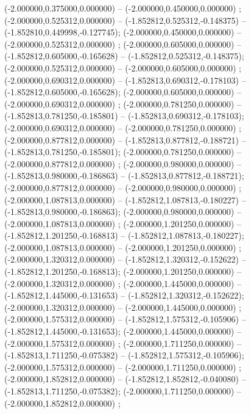  (-2.000000,0.375000,0.000000) -- (-2.000000,0.450000,0.000000) ;
 (-2.000000,0.525312,0.000000) -- (-1.852812,0.525312,-0.148375) -- (-1.852810,0.449998,-0.127745);
 (-2.000000,0.450000,0.000000) -- (-2.000000,0.525312,0.000000) ;
 (-2.000000,0.605000,0.000000) -- (-1.852812,0.605000,-0.165628) -- (-1.852812,0.525312,-0.148375);
 (-2.000000,0.525312,0.000000) -- (-2.000000,0.605000,0.000000) ;
 (-2.000000,0.690312,0.000000) -- (-1.852813,0.690312,-0.178103) -- (-1.852812,0.605000,-0.165628);
 (-2.000000,0.605000,0.000000) -- (-2.000000,0.690312,0.000000) ;
 (-2.000000,0.781250,0.000000) -- (-1.852813,0.781250,-0.185801) -- (-1.852813,0.690312,-0.178103);
 (-2.000000,0.690312,0.000000) -- (-2.000000,0.781250,0.000000) ;
 (-2.000000,0.877812,0.000000) -- (-1.852813,0.877812,-0.188721) -- (-1.852813,0.781250,-0.185801);
 (-2.000000,0.781250,0.000000) -- (-2.000000,0.877812,0.000000) ;
 (-2.000000,0.980000,0.000000) -- (-1.852813,0.980000,-0.186863) -- (-1.852813,0.877812,-0.188721);
 (-2.000000,0.877812,0.000000) -- (-2.000000,0.980000,0.000000) ;
 (-2.000000,1.087813,0.000000) -- (-1.852812,1.087813,-0.180227) -- (-1.852813,0.980000,-0.186863);
 (-2.000000,0.980000,0.000000) -- (-2.000000,1.087813,0.000000) ;
 (-2.000000,1.201250,0.000000) -- (-1.852812,1.201250,-0.168813) -- (-1.852812,1.087813,-0.180227);
 (-2.000000,1.087813,0.000000) -- (-2.000000,1.201250,0.000000) ;
 (-2.000000,1.320312,0.000000) -- (-1.852812,1.320312,-0.152622) -- (-1.852812,1.201250,-0.168813);
 (-2.000000,1.201250,0.000000) -- (-2.000000,1.320312,0.000000) ;
 (-2.000000,1.445000,0.000000) -- (-1.852812,1.445000,-0.131653) -- (-1.852812,1.320312,-0.152622);
 (-2.000000,1.320312,0.000000) -- (-2.000000,1.445000,0.000000) ;
 (-2.000000,1.575312,0.000000) -- (-1.852812,1.575312,-0.105906) -- (-1.852812,1.445000,-0.131653);
 (-2.000000,1.445000,0.000000) -- (-2.000000,1.575312,0.000000) ;
 (-2.000000,1.711250,0.000000) -- (-1.852813,1.711250,-0.075382) -- (-1.852812,1.575312,-0.105906);
 (-2.000000,1.575312,0.000000) -- (-2.000000,1.711250,0.000000) ;
 (-2.000000,1.852812,0.000000) -- (-1.852812,1.852812,-0.040080) -- (-1.852813,1.711250,-0.075382);
 (-2.000000,1.711250,0.000000) -- (-2.000000,1.852812,0.000000) ;
